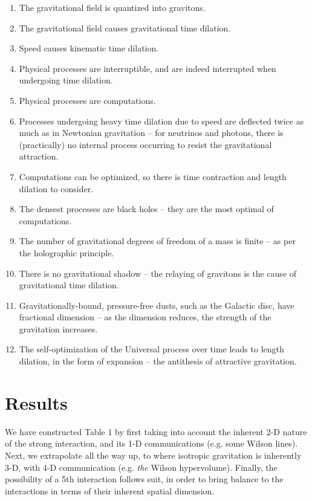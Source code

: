 \documentclass[12pt]{article}
\begin{document}
\begin{enumerate}
\item The gravitational field is quantized into gravitons.
\item The gravitational field causes gravitational time dilation.
\item Speed causes kinematic time dilation.
\item Physical processes are interruptible, and are indeed interrupted when undergoing time dilation. 
\item Physical processes are computations.
\item Processes undergoing heavy time dilation due to speed are deflected twice as much as in Newtonian gravitation -- for neutrinos and photons, there is (practically) no internal process occurring to resist the gravitational attraction.
\item Computations can be optimized, so there is time contraction and length dilation to consider.
\item The densest processes are black holes -- they are the most optimal of computations.
\item The number of gravitational degrees of freedom of a mass is finite -- as per the holographic principle.
\item There is no gravitational shadow -- the relaying of gravitons is the cause of gravitational time dilation.
\item Gravitationally-bound, pressure-free dusts, such as the Galactic disc, have fractional dimension -- as the dimension reduces, the strength of the gravitation increases.
\item The self-optimization of the Universal process over time leads to length dilation, in the form of expansion -- the antithesis of attractive gravitation.
\end{enumerate}







\section{Results}

We have constructed Table 1 by first taking into account the inherent 2-D nature of the strong interaction, and its 1-D communications (e.g. some Wilson lines).
Next, we extrapolate all the way up, to where isotropic gravitation is inherently 3-D, with 4-D communication (e.g. {\textit{the}} Wilson hypervolume). 
Finally, the possibility of a 5th interaction follows suit, in order to bring balance to the interactions in terms of their inherent spatial dimension.
\end{document}
